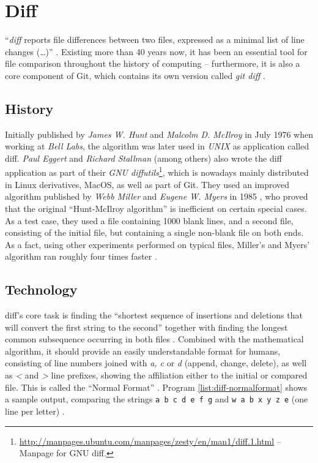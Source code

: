 \section{Diff}
\label{sec:diff}

``\emph{diff} reports file differences between two files, expressed as a minimal list of line changes (\ldots)'' \cite[1]{Hunt1976}. Existing more than 40 years now, it has been an essential tool for file comparison throughout the history of computing -- furthermore, it is also a core component of Git, which contains its own version called \emph{git diff} \cite[108]{loeliger2012version}.

\subsection{History}
\label{sec:diff-history}
Initially published by \emph{James W. Hunt} and \emph{Malcolm D. McIlroy} in July 1976 when working at \emph{Bell Labs}, the algorithm was later used in \emph{UNIX} as application called diff. \emph{Paul Eggert} and \emph{Richard Stallman} (among others) also wrote the diff application as part of their \emph{GNU diffutils}\footnote{\url{http://manpages.ubuntu.com/manpages/zesty/en/man1/diff.1.html} -- Manpage for GNU diff.}, which is nowadays mainly distributed in Linux derivatives, MacOS, as well as part of Git. They used an improved algorithm published by \emph{Webb Miller} and \emph{Eugene W. Myers} in 1985 \cite[3]{mackenzie2003comparing}, who proved that the original ``Hunt-McIlroy algorithm'' is inefficient on certain special cases. As a test case, they used a file containing 1000 blank lines, and a second file, consisting of the initial file, but containing a single non-blank file on both ends. As a fact, using other experiments performed on typical files, Miller's and Myers' algorithm ran roughly four times faster \cite[p. 1034f]{miller1985file}.

\subsection{Technology}
diff's core task is finding the ``shortest sequence of insertions and deletions that will convert the first string to the second'' \cite[1025]{miller1985file} together with finding the longest common subsequence occurring in both files \cite[2]{Hunt1976}. Combined with the mathematical algorithm, it should provide an easily understandable format for humans, consisting of line numbers joined with \emph{a, c} or \emph{d} (append, change, delete), as well as \emph{<} and \emph{>} line prefixes, showing the affiliation either to the initial or compared file. This is called the ``Normal Format'' \cite[12]{mackenzie2003comparing}. Program \ref{list:diff-normalformat} shows a sample output, comparing the strings \texttt{a b c d e f g} and \texttt{w a b x y z e} (one line per letter) \cite[p. 1f]{Hunt1976}.

